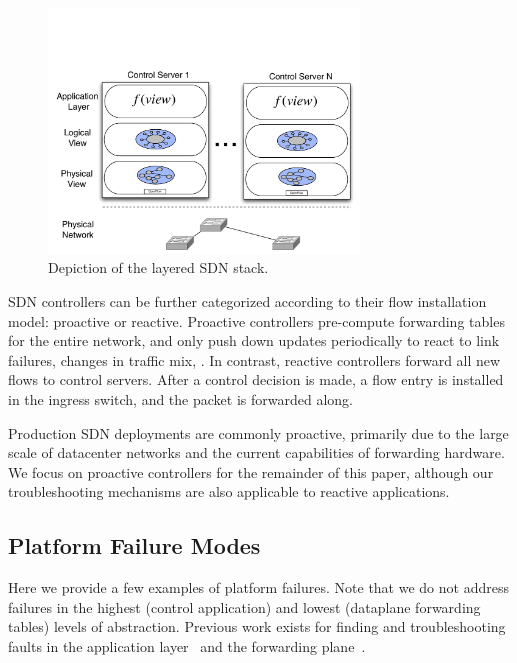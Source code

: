 \begin{figure}[t]
    \includegraphics[width=3.25in]{../diagrams/architecture/SDN_Stack.pdf}
    \caption[]{\label{fig:basicarch} Depiction of the layered SDN stack.} 
\end{figure}

SDN controllers can be further categorized according to their flow
installation model: proactive or reactive.
Proactive controllers pre-compute forwarding tables for the entire network,
and only push down updates periodically to react to link failures, changes in
traffic mix, \etc. In contrast, reactive controllers forward all new flows to
control servers. After a control decision is made, a flow entry is installed
in the ingress switch, and the packet is forwarded along.

Production SDN deployments are commonly proactive, primarily due to the large
scale of datacenter networks and the current capabilities of forwarding hardware.
We focus on proactive controllers for the remainder of this paper,
although our troubleshooting mechanisms are also applicable to reactive
applications.

\subsection{Platform Failure Modes}

Here we provide a few examples of platform failures. Note that
we do not address failures in the highest (control application) and lowest
(dataplane forwarding tables) levels of abstraction. Previous work exists
for finding and troubleshooting faults in the application layer~\cite{nice}
and the forwarding plane~\cite{anteater}. 

